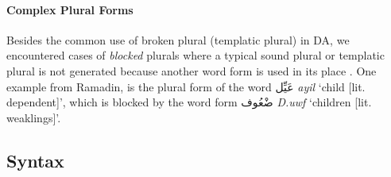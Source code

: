 

\paragraph{Complex Plural Forms}
Besides the common use of broken plural (templatic plural) in DA, we encountered cases of {\it blocked} plurals where a typical sound plural or templatic plural is not generated because another word form is used in its place \citep{aronoff1976word}. One example from Ramadin, is the plural form  of 
 the word
\foreignlanguage{arabic}{عَيِّل}
{\it {\AYN}ay{\SHADDA}il} 
 `child [lit. dependent]', which is blocked by the word form \foreignlanguage{arabic}{ضْعُوف} 
{\it D.{\AYN}uwf} 
 `children [lit. weaklings]'.



\subsection*{Syntax}

